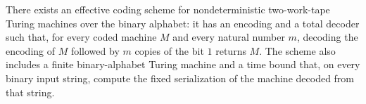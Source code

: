 \begin{theorem}
\label{Turing.exists_effectiveNDMachineCode}
\leanok
{}
There exists an effective coding scheme for nondeterministic two-work-tape Turing
machines over the binary alphabet: it has an encoding and a total decoder such that, for
every coded machine $M$ and every natural number $m$, decoding the encoding of $M$
followed by $m$ copies of the bit $1$ returns $M$. The scheme also includes a finite
binary-alphabet Turing machine and a time bound that, on every binary input string,
compute the fixed serialization of the machine decoded from that string.
\end{theorem}
